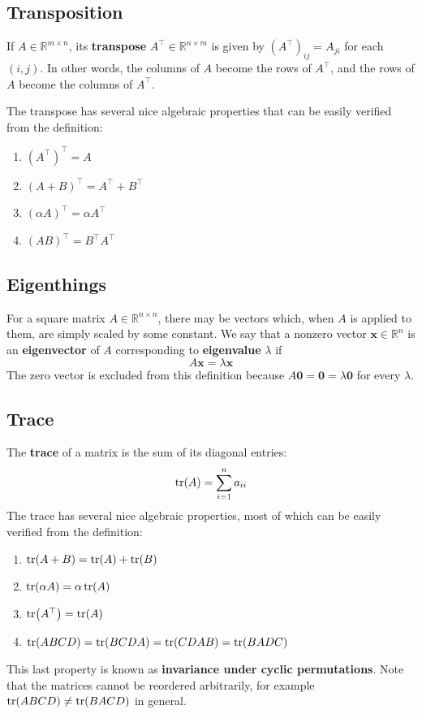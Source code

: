 \documentclass{article}
\newcommand{\R}{\mathbb{R}}
\renewcommand{\vec}[1]{\mathbf{#1}}
\newcommand{\tran}{^\top}
\newcommand{\term}[1]{\textbf{#1}}
\begin{document}
\subsection{Transposition}
If $A \in \R^{m \times n}$, its \term{transpose} $A\tran \in \R^{n \times m}$ is given by $(A\tran)_{ij} = A_{ji}$ for each $(i, j)$. In other words, the columns of $A$ become the rows of $A\tran$, and the rows of $A$ become the columns of $A\tran$.

The transpose has several nice algebraic properties that can be easily verified from the definition:
\begin{enumerate}
\item $(A\tran)\tran = A$
\item $(A+B)\tran = A\tran + B\tran$
\item $(\alpha A)\tran = \alpha A\tran$
\item $(AB)\tran = B\tran A\tran$
\end{enumerate}

\subsection{Eigenthings}
For a square matrix $A \in \R^{n \times n}$, there may be vectors which, when $A$ is applied to them, are simply scaled by some constant. We say that a nonzero vector $\vec{x} \in \R^n$ is an \term{eigenvector} of $A$ corresponding to \term{eigenvalue} $\lambda$ if
\[A\vec{x} = \lambda\vec{x}\]
The zero vector is excluded from this definition because $A\vec{0} = \vec{0} = \lambda\vec{0}$ for every $\lambda$.

\subsection{Trace}
The \term{trace} of a matrix is the sum of its diagonal entries:
\[\tr(A) = \sum_{i=1}^n a_{ii}\]
The trace has several nice algebraic properties, most of which can be easily verified from the definition:
\begin{enumerate}
\item $\tr(A+B) = \tr(A) + \tr(B)$
\item $\tr(\alpha A) = \alpha\tr(A)$
\item $\tr(A\tran) = \tr(A)$
\item $\tr(ABCD) = \tr(BCDA) = \tr(CDAB) = \tr(BADC)$
\end{enumerate}
This last property is known as \term{invariance under cyclic permutations}. Note that the matrices cannot be reordered arbitrarily, for example $\tr(ABCD) \neq \tr(BACD)$ in general.
\end{document}
